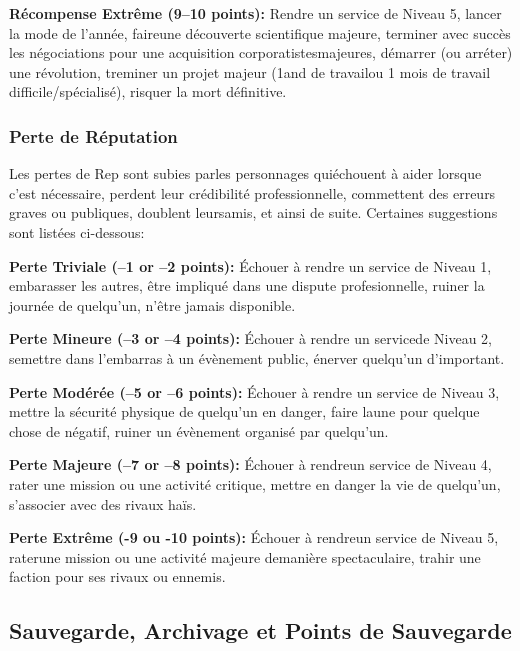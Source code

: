 {\textbf{Récompense Extrême (9–10 points):} Rendre un service de Niveau 5, lancer la mode de l'année, faireune découverte scientifique majeure, terminer avec succès les négociations pour une acquisition corporatistesmajeures, démarrer (ou arréter) une révolution, treminer un projet majeur (1and de travailou 1 mois de travail difficile/spécialisé), risquer la mort définitive. 

\subsubsection{Perte de Réputation} 

Les pertes de Rep sont subies parles personnages quiéchouent à aider lorsque c'est nécessaire, perdent leur crédibilité professionnelle, commettent des erreurs graves ou publiques, doublent leursamis, et ainsi de suite. Certaines suggestions sont listées ci-dessous: 

\textbf{Perte Triviale (–1 or –2 points):} Échouer à rendre un service de Niveau 1, embarasser les autres, être impliqué dans une dispute profesionnelle, ruiner la journée de quelqu'un, n'être jamais disponible. 

\textbf{Perte Mineure (–3 or –4 points):} Échouer à rendre un servicede Niveau 2, semettre dans l'embarras à un évènement public, énerver quelqu'un d'important. 

\textbf{Perte Modérée (–5 or –6 points):} Échouer à rendre un service de Niveau 3, mettre la sécurité physique de quelqu'un en danger, faire laune pour quelque chose de négatif, ruiner un évènement organisé par quelqu'un. 

\textbf{Perte Majeure (–7 or –8 points):} Échouer à rendreun service de Niveau 4, rater une mission ou une activité critique, mettre en danger la vie de quelqu'un, s'associer avec des rivaux haïs. 

\textbf{Perte Extrême (-9 ou -10 points): } Échouer à rendreun service de Niveau 5, raterune mission ou une activité majeure demanière spectaculaire, trahir une faction pour ses rivaux ou ennemis. 

\subsection{Sauvegarde, Archivage et Points de Sauvegarde} 

}
